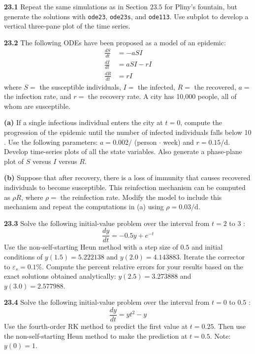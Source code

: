 \documentclass[../main.tex]{subfiles}
\begin{document}
\begin{multicols}{2}
    \noindent \textbf{23.1} Repeat the same simulations as in Section $23.5$ for Pliny's fountain, but generate the solutions with \texttt{ode23}, \texttt{ode23s}, and \texttt{ode113}. Use subplot to develop a vertical three-pane plot of the time series.\vspace{2mm}

    \noindent \textbf{23.2} The following ODEs have been proposed as a model of an epidemic:
    $$
    \begin{aligned}
    \frac{d S}{d t} &=-a S I \\
    \frac{d I}{d t} &=a S I-r I \\
    \frac{d R}{d t} &=r I
    \end{aligned}
    $$
    where $S=$ the susceptible individuals, $I=$ the infected, $R=$ the recovered, $a=$ the infection rate, and     $r=$ the recovery rate. A city has 10,000 people, all of whom are susceptible.

    \noindent\textbf{(a)} If a single infectious individual enters the city at $t=0$, compute the progression of    the epidemic until the number of infected individuals falls below 10 . Use the following parameters: $a=0.002  /$ (person $\cdot$ week) and $r=0.15 / \mathrm{d}$. Develop time-series plots of all the state variables.    Also generate a phase-plane plot of $S$ versus $I$ versus $R$.

    \noindent\textbf{(b)} Suppose that after recovery, there is a loss of immunity that causes recovered    individuals to become susceptible. This reinfection mechanism can be computed as $\rho R$, where $\rho=$ the   reinfection rate. Modify the model to include this mechanism and repeat the computations in (a) using $\rho=0.    03 / \mathrm{d}$.\vspace{2mm}

    \noindent \textbf{23.3} Solve the following initial-value problem over the interval from $t=2$ to 3 :
    $$
    \frac{d y}{d t}=-0.5 y+e^{-t}
    $$
    Use the non-self-starting Heun method with a step size of $0.5$ and initial conditions of $y(1.5)=5.222138$     and $y(2.0)=4.143883$. Iterate the corrector to $\varepsilon_{s}=0.1 \%$. Compute the percent relative errors   for your results based on the exact solutions obtained analytically: $y(2.5)=3.273888$ and $y(3.0)=2.577988$. \vspace{2mm}

    \noindent \textbf{23.4} Solve the following initial-value problem over the interval from $t=0$ to $0.5$ :
    $$
    \frac{d y}{d t}=y t^{2}-y
    $$
    Use the fourth-order RK method to predict the first value at $t=0.25$. Then use the non-self-starting Heun method to make the prediction at $t=0.5$. Note: $y(0)=1$.\vspace{2mm}


\end{multicols}
\end{document}
